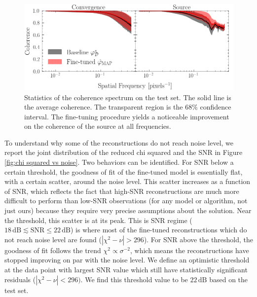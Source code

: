 \begin{figure}[t!]
        \centering
        \includegraphics[width=\linewidth]{figures/coherence_spectrum}
        \caption{Statistics of the coherence spectrum on the test set. The solid line is the average 
        coherence. The transparent region is the $68\%$ confidence interval. The fine-tuning 
        procedure yields a noticeable improvement on the coherence of the source at all frequencies.}
        \label{fig:coherence}
\end{figure}


To understand why some of the reconstructions do not reach noise level, we 
report the joint distribution of the reduced chi squared and the SNR in Figure \ref{fig:chi squared vs noise}.
Two behaviors can be identified. For SNR below a certain threshold, the goodness of fit 
of the fine-tuned model is essentially flat, with a certain scatter, around the noise level. 
This scatter increases as a function of SNR, which reflects the fact that high-SNR reconstructions are much more difficult to perform than low-SNR observations (for any model or algorithm, not just ours) because they require very precise assumptions about the solution. 
Near the threshold, this scatter is at its peak. This is SNR regime ($18\,\mathrm{dB} \lesssim \mathrm{SNR} \leq 22\,\mathrm{dB}$) is where most of the fine-tuned reconstructions which do not reach noise level are found ($|\chi^2 - \nu| > 296$).
For SNR above the threshold, 
the goodness of fit follows the trend $\chi^2 \propto \sigma^{-2}$, which 
means the reconstructions have stopped improving on par with the noise level.
We define an optimistic threshold at the data point with largest 
SNR value which still have statistically significant residuals ($|\chi^2 - \nu| < 296)$. We 
find this threshold value to be $22\, \mathrm{dB}$ based on the test set. 

